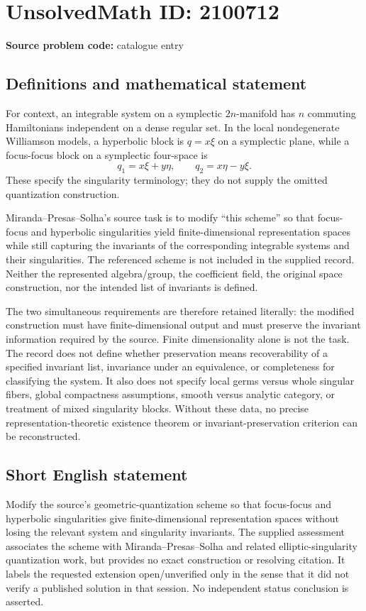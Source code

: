 \documentclass[11pt]{article}
\begin{document}
\section*{UnsolvedMath ID: 2100712}
\textbf{Source problem code:} catalogue entry
\subsection{Definitions and mathematical statement}
For context, an integrable system on a symplectic $2n$-manifold has $n$ commuting Hamiltonians independent on a dense regular set. In the local nondegenerate Williamson models, a hyperbolic block is $q=x\xi$ on a symplectic plane, while a focus-focus block on a symplectic four-space is
\[
 q_1=x\xi+y\eta,\qquad q_2=x\eta-y\xi.
\]
These specify the singularity terminology; they do not supply the omitted quantization construction.

Miranda--Presas--Solha's source task is to modify ``this scheme'' so that focus-focus and hyperbolic singularities yield finite-dimensional representation spaces while still capturing the invariants of the corresponding integrable systems and their singularities. The referenced scheme is not included in the supplied record. Neither the represented algebra/group, the coefficient field, the original space construction, nor the intended list of invariants is defined.

The two simultaneous requirements are therefore retained literally: the modified construction must have finite-dimensional output and must preserve the invariant information required by the source. Finite dimensionality alone is not the task. The record does not define whether preservation means recoverability of a specified invariant list, invariance under an equivalence, or completeness for classifying the system. It also does not specify local germs versus whole singular fibers, global compactness assumptions, smooth versus analytic category, or treatment of mixed singularity blocks. Without these data, no precise representation-theoretic existence theorem or invariant-preservation criterion can be reconstructed.
\subsection{Short English statement}
Modify the source's geometric-quantization scheme so that focus-focus and hyperbolic singularities give finite-dimensional representation spaces without losing the relevant system and singularity invariants. The supplied assessment associates the scheme with Miranda--Presas--Solha and related elliptic-singularity quantization work, but provides no exact construction or resolving citation. It labels the requested extension open/unverified only in the sense that it did not verify a published solution in that session. No independent status conclusion is asserted.
\end{document}
